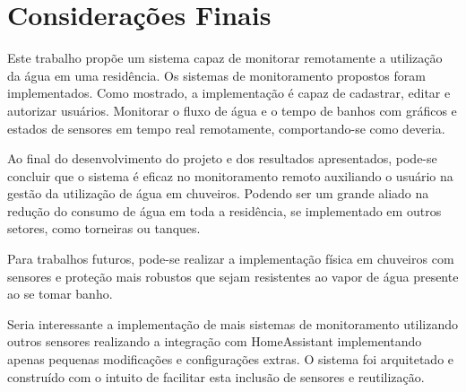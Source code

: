 \chapter{Considerações Finais}

Este trabalho propõe um sistema capaz de monitorar remotamente a utilização da água em uma residência. Os sistemas de monitoramento propostos foram implementados. Como mostrado, a implementação é capaz de cadastrar, editar e autorizar usuários. Monitorar o fluxo de água e o tempo de banhos com gráficos e estados de sensores em tempo real remotamente, comportando-se como deveria.

Ao final do desenvolvimento do projeto e dos resultados apresentados, pode-se concluir que o sistema é eficaz no monitoramento remoto auxiliando o usuário na gestão da utilização de água em chuveiros. Podendo ser um grande aliado na redução do consumo de água em toda a residência, se implementado em outros setores, como torneiras ou tanques.

Para trabalhos futuros, pode-se realizar a implementação física em chuveiros com sensores e proteção mais robustos que sejam resistentes ao vapor de água presente ao se tomar banho. 

Seria interessante a implementação de mais sistemas de monitoramento utilizando outros sensores realizando a integração com HomeAssistant implementando apenas pequenas modificações e configurações extras. O sistema foi arquitetado e construído com o intuito de facilitar esta inclusão de sensores e reutilização.
